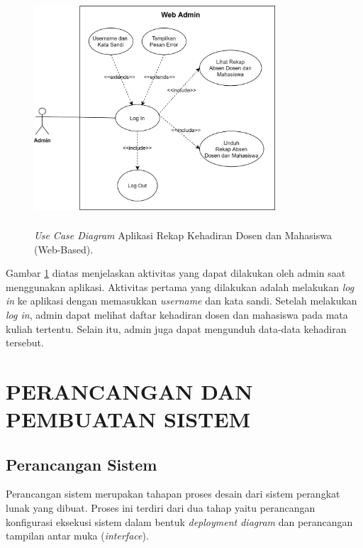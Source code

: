	\begin{figure}[H] 
		\center
		\shadowbox
		{\includegraphics [width=9cm, height=8cm]{gambar/model/use-case-admin}}
		\caption{\textit{Use Case Diagram} Aplikasi Rekap Kehadiran Dosen dan Mahasiswa (Web-Based).}
		\label{usecaseadmin}
	\end{figure}
	
\par Gambar \ref{usecaseadmin} diatas menjelaskan aktivitas yang dapat dilakukan oleh admin saat menggunakan aplikasi. Aktivitas pertama yang dilakukan adalah melakukan \textit{log in} ke aplikasi dengan memasukkan \textit{username} dan kata sandi. Setelah melakukan \textit{log in}, admin dapat melihat daftar kehadiran dosen dan mahasiswa pada mata kuliah tertentu. Selain itu, admin juga dapat mengunduh data-data kehadiran tersebut.
	


	\section{\uppercase{PERANCANGAN DAN PEMBUATAN SISTEM}}
	
	\subsection{Perancangan Sistem}
	\par Perancangan sistem merupakan tahapan proses desain dari sistem perangkat lunak yang dibuat. Proses ini terdiri dari dua tahap yaitu perancangan konfigurasi eksekusi sistem dalam bentuk \textit{deployment diagram} dan perancangan tampilan antar muka (\textit{interface}).
	
